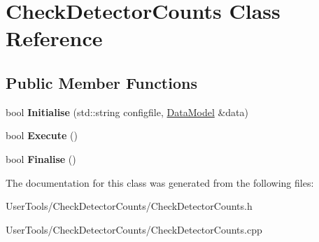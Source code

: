 \hypertarget{classCheckDetectorCounts}{
\section{CheckDetectorCounts Class Reference}
\label{classCheckDetectorCounts}
}
\subsection*{Public Member Functions}
\begin{DoxyCompactItemize}
\item 
\hypertarget{classCheckDetectorCounts_ac64b90d8952c7d3b1f970c7f7d6180df}{
bool {\bfseries Initialise} (std::string configfile, \hyperlink{classDataModel}{DataModel} \&data)}
\label{classCheckDetectorCounts_ac64b90d8952c7d3b1f970c7f7d6180df}

\item 
\hypertarget{classCheckDetectorCounts_a5e10b7af8ac4184d2cfc695b47e5c23d}{
bool {\bfseries Execute} ()}
\label{classCheckDetectorCounts_a5e10b7af8ac4184d2cfc695b47e5c23d}

\item 
\hypertarget{classCheckDetectorCounts_a7fb977a13d93552a7e7feefd9a419125}{
bool {\bfseries Finalise} ()}
\label{classCheckDetectorCounts_a7fb977a13d93552a7e7feefd9a419125}

\end{DoxyCompactItemize}


The documentation for this class was generated from the following files:\begin{DoxyCompactItemize}
\item 
UserTools/CheckDetectorCounts/CheckDetectorCounts.h\item 
UserTools/CheckDetectorCounts/CheckDetectorCounts.cpp\end{DoxyCompactItemize}
